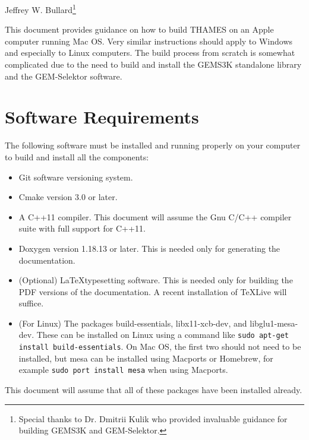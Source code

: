 \documentclass{article}
\begin{document}
\begin{center}
    \Large{\textbf{}}
\end{center}
\begin{center}
    \large{Jeffrey W. Bullard\footnote{Special thanks to Dr. Dmitrii Kulik who
    provided invaluable guidance for building GEMS3K and GEM-Selektor.}}
\end{center}
\begin{center}
    \large{\DTMnow}
\end{center}

\vspace{0.25truein}
\tableofcontents

\vspace{0.25truein}
This document provides guidance on how to build THAMES on an Apple computer running
Mac OS.  Very similar instructions should apply to Windows and especially to Linux
computers.  The build process from scratch is somewhat complicated due to the need
to build and install the GEMS3K standalone library and the GEM-Selektor software.

\section{Software Requirements}
The following software must be installed and running properly on your computer to
build and install all the components:
\begin{itemize}
    \item Git software versioning system.
    \item Cmake version 3.0 or later.
    \item A C++11 compiler.  This document will assume the Gnu C/C++ compiler suite with
        full support for C++11.
    \item Doxygen version 1.18.13 or later. This is needed only for generating the
        documentation.
    \item (Optional) \LaTeX typesetting software.  This is needed only for building the PDF versions
        of the documentation.  A recent installation of \TeX Live will suffice. 
    \item (For Linux) The packages build-essentials, libx11-xcb-dev, and libglu1-mesa-dev.
        These can be installed on Linux using a command like \verb!sudo apt-get install build-essentials!.  On Mac OS, the first two should not need to be installed, but mesa can be
        installed using Macports or Homebrew, for example \verb!sudo port install mesa! when
        using Macports.
\end{itemize}
This document will assume that all of these packages have been installed already.
\end{document}
